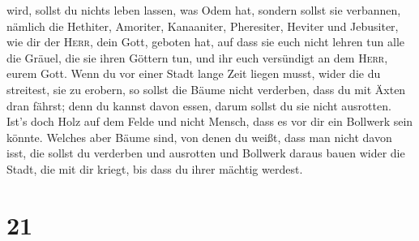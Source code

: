 wird, sollst du nichts leben lassen, was Odem hat, 
sondern sollst sie verbannen, nämlich die Hethiter, Amoriter,
Kanaaniter, Pheresiter, Heviter und Jebusiter, wie dir der
\textsc{Herr}, dein Gott, geboten hat,  auf dass sie euch
nicht lehren tun alle die Gräuel, die sie ihren Göttern tun, und ihr
euch versündigt an dem \textsc{Herr}, eurem Gott.  Wenn
du vor einer Stadt lange Zeit liegen musst, wider die du streitest, sie
zu erobern, so sollst die Bäume nicht verderben, dass du mit Äxten dran
fährst; denn du kannst davon essen, darum sollst du sie nicht ausrotten.
Ist's doch Holz auf dem Felde und nicht Mensch, dass es vor dir ein
Bollwerk sein könnte.  Welches aber Bäume sind, von denen
du weißt, dass man nicht davon isst, die sollst du verderben und
ausrotten und Bollwerk daraus bauen wider die Stadt, die mit dir kriegt,
bis dass du ihrer mächtig werdest.

\hypertarget{section-20}{%
\section{21}\label{section-20}}

